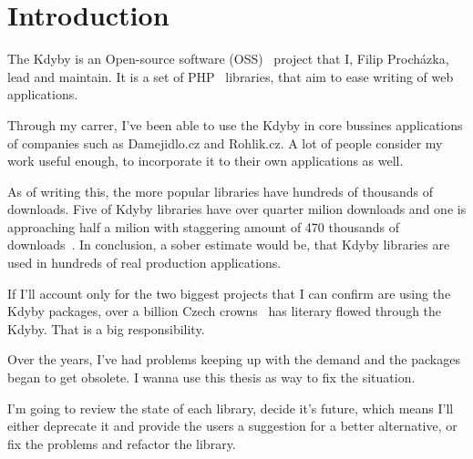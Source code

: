 \chapter{Introduction}

The Kdyby is an Open-source software (OSS)~\cite{wiki:oss} project that I, Filip Procházka, lead and maintain. It is a set of PHP~\cite{wiki:php} libraries, that aim to ease writing of web applications.

Through my carrer, I've been able to use the Kdyby in core bussines applications of companies such as Damejidlo.cz and Rohlik.cz. A lot of people consider my work useful enough, to incorporate it to their own applications as well.

As of writing this, the more popular libraries have hundreds of thousands of downloads. Five of Kdyby libraries have over quarter milion downloads and one is approaching half a milion with staggering amount of 470 thousands of downloads~\cite{packagist:kdyby}. In conclusion, a sober estimate would be, that Kdyby libraries are used in hundreds of real production applications.

If I'll account only for the two biggest projects that I can confirm are using the Kdyby packages, over a billion Czech crowns~\cite{tyinternety:rohlik-billion} has literary flowed through the Kdyby. That is a big responsibility.

Over the years, I've had problems keeping up with the demand and the packages began to get obsolete. I wanna use this thesis as way to fix the situation.

I'm going to review the state of each library, decide it's future, which means I'll either deprecate it and provide the users a suggestion for a better alternative, or fix the problems and refactor the library.
